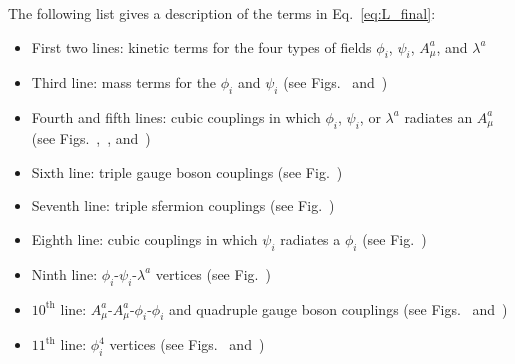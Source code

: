 \documentclass[dissertation.tex]{subfiles}
\begin{document}
The following list gives a description of the terms in Eq.~\ref{eq:L_final}:

\begin{itemize}
  \item First two lines: kinetic terms for the four types of fields $\phi_{i}$, $\psi_{i}$, $A_{\mu}^{a}$, and $\lambda^{a}$
  \item Third line: mass terms for the $\phi_{i}$ and $\psi_{i}$ (see Figs.~ and~)
  \item Fourth and fifth lines: cubic couplings in which $\phi_{i}$, $\psi_{i}$, or $\lambda^{a}$ radiates an $A_{\mu}^{a}$ (see Figs.~,~, and~)
  \item Sixth line: triple gauge boson couplings (see Fig.~)
  \item Seventh line: triple sfermion couplings (see Fig.~)
  \item Eighth line: cubic couplings in which $\psi_{i}$ radiates a $\phi_{i}$ (see Fig.~)
  \item Ninth line: $\phi_{i}$-$\psi_{i}$-$\lambda^{a}$ vertices (see Fig.~)
  \item $10^{\mathrm{th}}$ line: $A_{\mu}^{a}$-$A_{\mu}^{a}$-$\phi_{i}$-$\phi_{i}$ and quadruple gauge boson couplings (see Figs.~ and~)
  \item $11^{\mathrm{th}}$ line: $\phi_{i}^{4}$ vertices (see Figs.~ and~)
\end{itemize}
\end{document}
